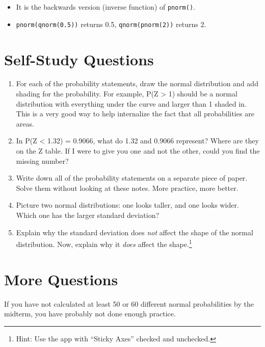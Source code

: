 \documentclass[
  letterpaper,
  DIV=11,
  numbers=noendperiod,
  oneside]{scrreprt}
\providecommand{\tightlist}{%
  \setlength{\itemsep}{0pt}\setlength{\parskip}{0pt}}\usepackage{longtable,booktabs,array}
\begin{document}
\begin{itemize}
\begin{itemize}
    \begin{itemize}
    \tightlist
    \item
      It is the backwards version (inverse function) of
      \texttt{pnorm()}.
    \item
      \texttt{pnorm(qnorm(0.5))} returns 0.5, \texttt{qnorm(pnorm(2))}
      returns 2.
    \end{itemize}
  \end{itemize}
\end{itemize}

\hypertarget{self-study-questions-1}{%
\section{Self-Study Questions}\label{self-study-questions-1}}

\begin{enumerate}
\def\labelenumi{\arabic{enumi}.}
\tightlist
\item
  For each of the probability statements, draw the normal distribution
  and add shading for the probability. For example, P(Z \textgreater{}
  1) should be a normal distribution with everything under the curve and
  larger than 1 shaded in. This is a very good way to help internalize
  the fact that all probabilities are areas.
\item
  In P(Z \textless{} 1.32) = 0.9066, what do 1.32 and 0.9066 represent?
  Where are they on the Z table. If I were to give you one and not the
  other, could you find the missing number?
\item
  Write down all of the probability statements on a separate piece of
  paper. Solve them without looking at these notes. More practice, more
  better.
\item
  Picture two normal distributions: one looks taller, and one looks
  wider. Which one has the larger standard deviation?
\item
  Explain why the standard deviation does \emph{not} affect the shape of
  the normal distribution. Now, explain why it \emph{does} affect the
  shape.\footnote{Hint: Use the app with ``Sticky Axes'' checked and
    unchecked.}
\end{enumerate}

\hypertarget{more-questions}{%
\section{More Questions}\label{more-questions}}

If you have not calculated at least 50 or 60 different normal
probabilities by the midterm, you have probably not done enough
practice.
\end{document}
